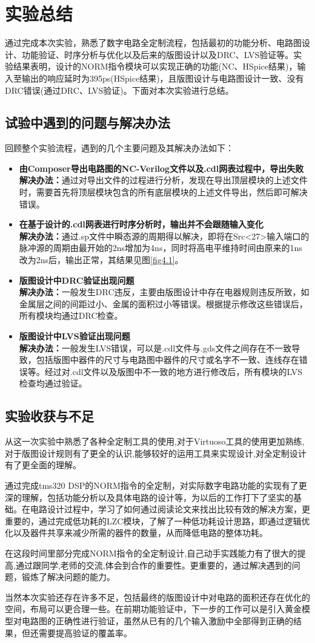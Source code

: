 \chapter{实验总结}
通过完成本次实验，熟悉了数字电路全定制流程，包括最初的功能分析、电路图设计、功能验证、时序分析与优化以及后来的版图设计以及DRC、LVS验证等。实验结果表明，设计的NORM指令模块可以实现正确的功能(NC、HSpice结果)，输入至输出的响应延时为395ps(HSpice结果)，且版图设计与电路图设计一致、没有DRC错误(通过DRC、LVS验证)。下面对本次实验进行总结。
\section{试验中遇到的问题与解决办法}
回顾整个实验流程，遇到的几个主要问题及其解决办法如下：
\begin{itemize}
\item \textbf{由Composer导出电路图的NC-Verilog文件以及.cdl网表过程中，导出失败} \\
\textbf{解决办法：}通过对导出文件的过程进行分析，发现在导出顶层模块的上述文件时，需要首先将顶层模块包含的所有底层模块的上述文件导出，然后即可解决错误。
\item \textbf{在基于设计的.cdl网表进行时序分析时，输出并不会跟随输入变化}\\
\textbf{解决办法：}通过.sp文件中瞬态源的周期得以解决，即将在Src<27>输入端口的脉冲源的周期由最开始的2ns增加为4ns，同时将高电平维持时间由原来的1ns改为2ns后，输出正常，其结果见图\ref{fig4.1}。
\item \textbf{版图设计中DRC验证出现问题} \\
\textbf{解决办法：}一般发生DRC违反，主要由版图设计中存在电器规则违反所致，如金属层之间的间距过小、金属的面积过小等错误。根据提示修改这些错误后，所有模块均通过DRC检查。
\item \textbf{版图设计中LVS验证出现问题}\\
\textbf{解决办法：}一般发生LVS错误，可以是.cdl文件与.gds文件之间存在不一致导致，包括版图中器件的尺寸与电路图中器件的尺寸或名字不一致、连线存在错误等。经过对.cdl文件以及版图中不一致的地方进行修改后，所有模块的LVS检查均通过验证。
\end{itemize}
\section{实验收获与不足}
从这一次实验中熟悉了各种全定制工具的使用,对于Virtuoso工具的使用更加熟练,对于版图设计规则有了更全的认识,能够较好的运用工具来实现设计,对全定制设计有了更全面的理解。

通过完成tms320 DSP的NORM指令的全定制，对实际数字电路功能的实现有了更深的理解，包括功能分析以及具体电路的设计等，为以后的工作打下了坚实的基础。在电路设计过程中，学习了如何通过阅读论文来找出比较有效的解决方案，更重要的，通过完成低功耗的LZC模块，了解了一种低功耗设计思路，即通过逻辑优化以及器件共享来减少所需的器件的数量，从而降低电路的整体功耗。

在这段时间里部分完成NORM指令的全定制设计,自己动手实践能力有了很大的提高,通过跟同学,老师的交流,体会到合作的重要性。更重要的，通过解决遇到的问题，锻炼了解决问题的能力。

当然本次实验还存在许多不足，包括最终的版图设计中对电路的面积还存在优化的空间，布局可以更合理一些。在前期功能验证中，下一步的工作可以是引入黄金模型对电路图的正确性进行验证，虽然从已有的几个输入激励中全部得到正确的结果，但还需要提高验证的覆盖率。

